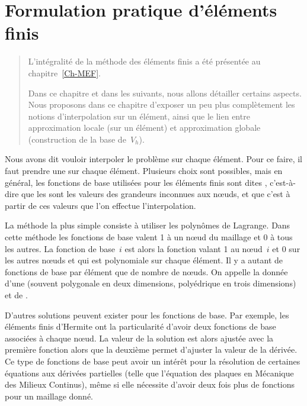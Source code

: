 \chapter{Formulation pratique d'éléments finis}\label{Ch-Elts}
\begin{abstract}
L'intégralité de la méthode des éléments finis a été présentée au chapitre~\ref{Ch-MEF}.

Dans ce chapitre et dans les suivants, nous allons détailler certains aspects. Nous proposons dans ce chapitre d'exposer un peu plus complètement les notions d'interpolation sur un élément, ainsi que le lien entre approximation locale (sur un élément) et approximation globale (construction de la base de~$V_h$).
\end{abstract}


Nous avons dit vouloir interpoler le problème sur chaque élément. Pour ce faire, il faut prendre une  sur chaque élément. Plusieurs choix sont possibles, mais en général, les fonctions de base utilisées pour les éléments finis sont dites , c'est-à-dire que les  sont les valeurs des grandeurs inconnues aux nœuds, et que c'est à partir de ces valeurs que l'on effectue l'interpolation.

\medskip
La méthode la plus simple consiste à utiliser les polynômes de Lagrange. Dans cette méthode les fonctions de base valent 1 à un nœud du maillage et 0 à tous les autres. La fonction de base~$i$ est alors la fonction valant 1 au nœud~$i$ et 0 sur les autres nœuds et qui est polynomiale sur chaque élément. Il y a autant de fonctions de base par élément que de nombre de nœuds. On appelle  la donnée d'une  (souvent polygonale en deux dimensions, polyédrique en trois dimensions) et de .

\medskip
D'autres solutions peuvent exister pour les fonctions de base. Par exemple, les éléments finis d'Hermite ont la particularité d'avoir deux fonctions de base associées à chaque nœud. La valeur de la solution est alors ajustée avec la première fonction alors que la deuxième permet d'ajuster la valeur de la dérivée. Ce type de fonctions de base peut avoir un intérêt pour la résolution de certaines équations aux dérivées partielles (telle que l'équation des plaques en Mécanique des Milieux Continus), même si elle nécessite d'avoir deux fois plus de fonctions pour un maillage donné.





